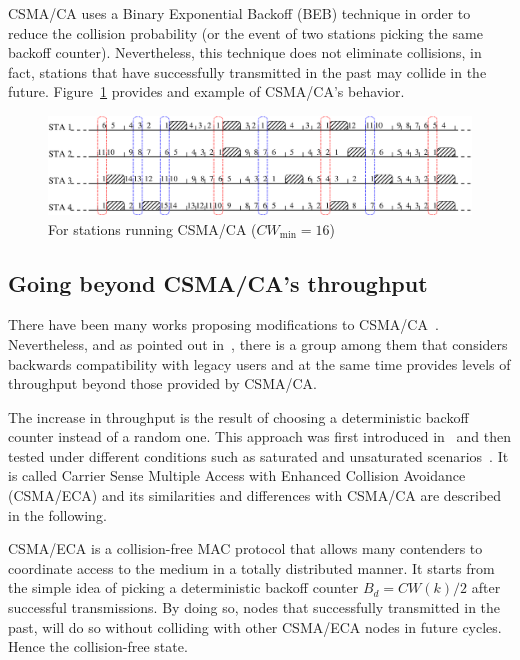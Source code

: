 CSMA/CA uses a Binary Exponential Backoff (BEB) technique in order to reduce the collision probability (or the event of two stations picking the same backoff counter). Nevertheless, this technique does not eliminate collisions, in fact, stations that have successfully transmitted in the past may collide in the future. Figure~\ref{fig:csmaCA} provides and example of CSMA/CA's behavior.

\begin{figure}[htbp]
  \centering
  \includegraphics[width=\linewidth]{csma_ca_short.eps}
  \caption{For stations running CSMA/CA ($CW_{\min}=16$)
  \label{fig:csmaCA}}
\end{figure}

\subsection{Going beyond CSMA/CA's throughput}
There have been many works proposing modifications to CSMA/CA~\cite{CSMA_ECA,bellalta2009vtc,L_MAC2,HE,bharghavan1994map,wang2004ncr,cali2000dti,lopez-toledo2006aoi,barcelo2008lba,hui2011epp,barcelo2011tcf}. Nevertheless, and as pointed out in~\cite{research2standards}, there is a group among them that considers backwards compatibility with legacy users and at the same time provides levels of throughput beyond those provided by CSMA/CA.

The increase in throughput is the result of choosing a deterministic backoff counter instead of a random one. This approach was first introduced in~\cite{barcelo2008lba} and then tested under different conditions such as saturated and unsaturated scenarios~\cite{CSMA_ECA,bellalta2009vtc,L_MAC2,HE}. It is called Carrier Sense Multiple Access with Enhanced Collision Avoidance (CSMA/ECA) and its similarities and differences with CSMA/CA are described in the following.

CSMA/ECA is a collision-free MAC protocol that allows many contenders to coordinate access to the medium in a totally distributed manner. It starts from the simple idea of picking a deterministic backoff counter $B_{d}=CW(k)/2$ after successful transmissions. By doing so, nodes that successfully transmitted in the past, will do so without colliding with other CSMA/ECA nodes in future cycles. Hence the collision-free state.

